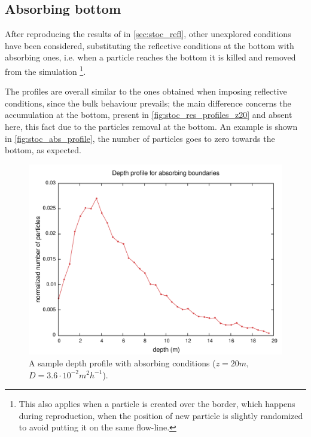 \subsection{Absorbing bottom} \label{sec:stoc_res_abs}
After reproducing the results of \autocite{Huisman2002HowPersist} in \autoref{sec:stoc_refl}, other unexplored conditions have been considered, substituting the reflective conditions at the bottom with absorbing ones, i.e. when a particle reaches the bottom it is killed and removed from the simulation \footnote{This also applies when a particle is created over the border, which happens during reproduction, when the position of new particle is slightly randomized to avoid putting it on the same flow-line. %
}.


 \label{sec:stoc_res_profile}
The profiles are overall similar to the ones obtained when imposing reflective conditions, since the bulk behaviour prevails; the main difference concerns the accumulation at the bottom, present in \autoref{fig:stoc_res_profiles_z20} and absent here, this fact due to the particles removal at the bottom. An example is shown in \autoref{fig:stoc_abs_profile}, the number of particles goes to zero towards the bottom, as expected.

\begin{figure} 
  \includegraphics[width=\textwidth]{data/1D_model/absorbing_bottom/abs_sample_profile}
  \caption{A sample depth profile with absorbing conditions ($z=20m$,$D=3.6\cdot10^{-2}m^2h^{-1}$).}
  \label{fig:stoc_abs_profile}
\end{figure}

